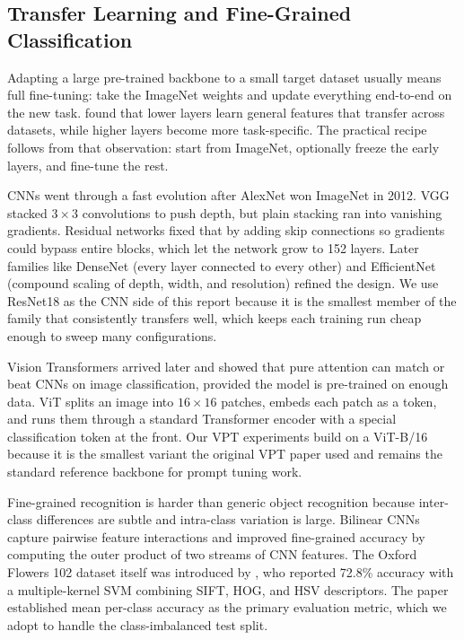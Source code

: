 \subsection{Transfer Learning and Fine-Grained Classification}

Adapting a large pre-trained backbone to a small target dataset usually means full fine-tuning: take the ImageNet weights and update everything end-to-end on the new task. \citet{yosinski2014transferable} found that lower layers learn general features that transfer across datasets, while higher layers become more task-specific. The practical recipe follows from that observation: start from ImageNet, optionally freeze the early layers, and fine-tune the rest.

CNNs went through a fast evolution after AlexNet \citep{krizhevsky2012alexnet} won ImageNet in 2012. VGG \citep{simonyan2014vgg} stacked $3 \times 3$ convolutions to push depth, but plain stacking ran into vanishing gradients. Residual networks \citep{he2016resnet} fixed that by adding skip connections so gradients could bypass entire blocks, which let the network grow to 152 layers. Later families like DenseNet \citep{huang2017densenet} (every layer connected to every other) and EfficientNet \citep{tan2019efficientnet} (compound scaling of depth, width, and resolution) refined the design. We use ResNet18 as the CNN side of this report because it is the smallest member of the family that consistently transfers well, which keeps each training run cheap enough to sweep many configurations.

Vision Transformers \citep{dosovitskiy2021vit} arrived later and showed that pure attention can match or beat CNNs on image classification, provided the model is pre-trained on enough data. ViT splits an image into $16 \times 16$ patches, embeds each patch as a token, and runs them through a standard Transformer encoder with a special classification token at the front. Our VPT experiments build on a ViT-B/16 because it is the smallest variant the original VPT paper used and remains the standard reference backbone for prompt tuning work.

Fine-grained recognition is harder than generic object recognition because inter-class differences are subtle and intra-class variation is large. Bilinear CNNs \citep{lin2015bilinear} capture pairwise feature interactions and improved fine-grained accuracy by computing the outer product of two streams of CNN features. The Oxford Flowers 102 dataset itself was introduced by \citet{nilsback2008}, who reported 72.8\% accuracy with a multiple-kernel SVM combining SIFT, HOG, and HSV descriptors. The paper established mean per-class accuracy as the primary evaluation metric, which we adopt to handle the class-imbalanced test split.

